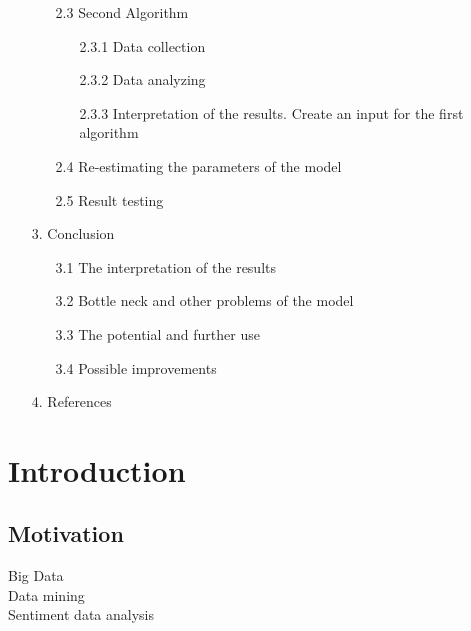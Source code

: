 \documentclass[12pt, a4paper]{article}
\begin{document}
\begin{enumerate}
\begin{enumerate}
			\item[2.3] Second Algorithm
				\begin{enumerate}
					\item[2.3.1] Data collection
					\item[2.3.2] Data analyzing
					\item[2.3.3] Interpretation of the results. Create an input for the first algorithm
				\end{enumerate}
			\item[2.4] Re-estimating the parameters of the model 
			\item[2.5] Result testing
		\end{enumerate}
	\item[3.] Conclusion
		\begin{enumerate}
			\item[3.1] The interpretation of the results
			\item[3.2] Bottle neck and other problems of the model
			\item[3.3] The potential and further use
			\item[3.4] Possible improvements
		\end{enumerate}
	\item[4.] References
\end{enumerate}

\newpage
\section{Introduction}
\subsection{Motivation}
Big Data\\
Data mining\\
Sentiment data analysis
\end{document}
